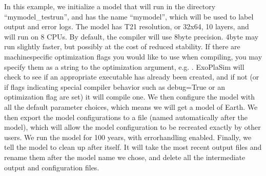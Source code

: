 \documentclass[letterpaper,10pt,english]{sphinxmanual}
\begin{document}
\begin{fulllineitems}
\begin{sphinxVerbatim}[commandchars=\\\{\}]
   
  
\end{sphinxVerbatim}

In this example, we initialize a model that will run in the directory
“mymodel\_testrun”, and has the name “mymodel”, which will be used to
label output and error logs. The model has T21 resolution, or 32x64,
10 layers, and will run on 8 CPUs. By default, the compiler will use
8\sphinxhyphen{}byte precision. 4\sphinxhyphen{}byte may run slightly faster, but possibly at the
cost of reduced stability. If there are machine\sphinxhyphen{}specific optimization
flags you would like to use when compiling, you may specify them as a
string to the optimization argument, e.g. . ExoPlaSim
will check to see if an appropriate executable has already been created,
and if not (or if flags indicating special compiler behavior such as
debug=True or an optimization flag are set) it will compile one. We then
configure the model with all the default parameter choices, which means
we will get a model of Earth. We then export the model configurations
to a  file (named automatically after the model), which will allow
the model configuration to be recreated exactly by other users. We
run the model for 100 years, with error\sphinxhyphen{}handling enabled. Finally, we
tell the model to clean up after itself. It will take the most recent
output files and rename them after the model name we chose, and delete
all the intermediate output and configuration files.


\end{fulllineitems}
\end{document}
